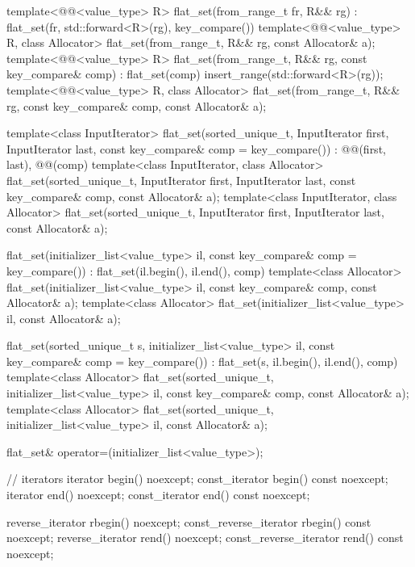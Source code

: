 \begin{codeblock}
{{    template<@@<value_type> R>
      flat_set(from_range_t fr, R&& rg)
        : flat_set(fr, std::forward<R>(rg), key_compare()) { }
    template<@@<value_type> R, class Allocator>
      flat_set(from_range_t, R&& rg, const Allocator& a);
    template<@@<value_type> R>
      flat_set(from_range_t, R&& rg, const key_compare& comp)
        : flat_set(comp)
        { insert_range(std::forward<R>(rg)); }
    template<@@<value_type> R, class Allocator>
       flat_set(from_range_t, R&& rg, const key_compare& comp, const Allocator& a);

    template<class InputIterator>
      flat_set(sorted_unique_t, InputIterator first, InputIterator last,
               const key_compare& comp = key_compare())
        : @@(first, last), @@(comp) { }
    template<class InputIterator, class Allocator>
      flat_set(sorted_unique_t, InputIterator first, InputIterator last,
               const key_compare& comp, const Allocator& a);
    template<class InputIterator, class Allocator>
      flat_set(sorted_unique_t, InputIterator first, InputIterator last, const Allocator& a);

    flat_set(initializer_list<value_type> il, const key_compare& comp = key_compare())
        : flat_set(il.begin(), il.end(), comp) { }
    template<class Allocator>
      flat_set(initializer_list<value_type> il, const key_compare& comp, const Allocator& a);
    template<class Allocator>
      flat_set(initializer_list<value_type> il, const Allocator& a);

    flat_set(sorted_unique_t s, initializer_list<value_type> il,
             const key_compare& comp = key_compare())
        : flat_set(s, il.begin(), il.end(), comp) { }
    template<class Allocator>
      flat_set(sorted_unique_t, initializer_list<value_type> il,
               const key_compare& comp, const Allocator& a);
    template<class Allocator>
      flat_set(sorted_unique_t, initializer_list<value_type> il, const Allocator& a);

    flat_set& operator=(initializer_list<value_type>);

    // iterators
    iterator               begin() noexcept;
    const_iterator         begin() const noexcept;
    iterator               end() noexcept;
    const_iterator         end() const noexcept;

    reverse_iterator       rbegin() noexcept;
    const_reverse_iterator rbegin() const noexcept;
    reverse_iterator       rend() noexcept;
    const_reverse_iterator rend() const noexcept;

}}
\end{codeblock}
